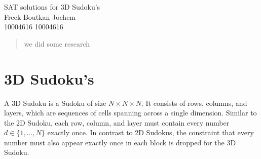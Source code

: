 \documentclass{article}
\begin{document}
\begin{center}
\Large{SAT solutions for 3D Sudoku's}\\
\vspace{.5cm}
\small{Freek Boutkan \hspace{1.5cm} Jochem\\
10004616 \hspace{1.5cm} 10004616}
\end{center}

\begin{abstract}
we did some research
\end{abstract}

\section{3D Sudoku's}

A 3D Sudoku is a Sudoku of size $N \times N \times N$. It consists of rows, columns, and layers, which are sequences of cells spanning across a single dimension. Similar to the 2D Sudoku, each row, column, and layer must contain every number $d \in \{1, \hdots, N\}$ exactly once. In contrast to 2D Sudokus, the constraint that every number must also appear exactly once in each block is dropped for the 3D Sudoku. 
\end{document}
